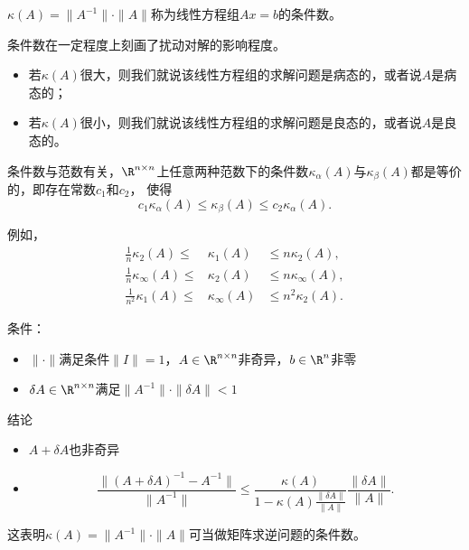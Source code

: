 \begin{frame}\ft{\secname}

\begin{dingyi}[条件数]
$\kappa(A) =\| A^{-1} \|\cdot \| A \|$称为线性方程组$Ax=b$的\textcolor{acolor3}{条件数}。
\end{dingyi}
\vspace{0.2cm}
\pause

条件数在一定程度上刻画了扰动对解的影响程度。\pause 
\begin{itemize}
\item
{若$\kappa(A)$很大，则我们就说该线性方程组的求解问题是病态的，或者说$A$是病态的；} \pause 
\item
{若$\kappa(A)$很小，则我们就说该线性方程组的求解问题是良态的，或者说$A$是良态的。}
\end{itemize}


\end{frame}

\begin{frame}\ft{\secname}

\textcolor{acolor5}{条件数与范数有关}，$\R^{n\times n}$上任意两种范数下的条件数$\kappa_{\alpha}(A)$与$\kappa_{\beta}(A)$都是等价的，即存在常数$c_1$和$c_2$，
使得
$$
c_1 \kappa_{\alpha}(A) \le \kappa_{\beta}(A) \le c_2 \kappa_{\alpha}(A).
$$

例如，
$$
\begin{array}{rcl}
\frac1n \kappa_2(A) \le & \kappa_1(A) & \le n \kappa_2(A), \\[0.2cm]
\frac1n \kappa_{\infty}(A) \le & \kappa_2(A) & \le n \kappa_{\infty}(A), \\[0.2cm]
\frac1{n^2} \kappa_1(A) \le & \kappa_{\infty}(A) & \le n^2 \kappa_2(A).
\end{array}
$$


\end{frame}

\begin{frame}\ft{\secname}

\begin{tuilun}
\textcolor{acolor5}{条件：}
\begin{itemize}
\item 
$\|\cdot\|$满足条件$\|I\|=1$，$A\in \R^{n\times n}$非奇异，$b\in \R^{n}$非零
\item
$\delta A\in \R^{n\times n}$满足$\|A^{-1}\|\cdot\|\delta A\|<1$
\end{itemize}
\pause 
\textcolor{acolor5}{结论}
\begin{itemize}
\item $A+\delta A$也非奇异
\item
$$
\frac{\|(A+\delta A)^{-1} - A^{-1}\|}{\|A^{-1}\|}
\le
\frac{\kappa(A)}{1-\kappa(A)\frac{\|\delta A\|}{\|A\|}}
\frac{\|\delta A \|}{\|A\|}.
$$
\end{itemize}

\end{tuilun}
\vspace{0.2cm}
\pause

\textcolor{acolor3}{这表明$\kappa(A) =\| A^{-1} \|\cdot \| A \| $可当做矩阵求逆问题的条件数。}


\end{frame}

